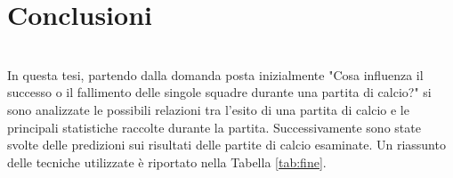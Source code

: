 \chapter{Conclusioni}
\label{cap:conclusioni}

\\

In questa tesi, partendo dalla domanda posta inizialmente "Cosa influenza il successo o il fallimento delle singole squadre durante una partita di calcio?" si sono analizzate le possibili relazioni tra l'esito di una partita di calcio e le principali statistiche raccolte durante la partita.  Successivamente sono state svolte delle predizioni sui risultati delle partite di calcio esaminate.
Un riassunto delle tecniche utilizzate è riportato nella Tabella \ref{tab:fine}.
